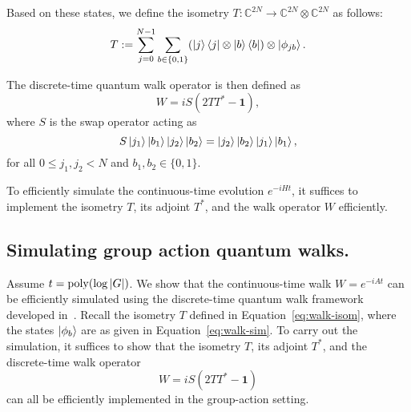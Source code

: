 \documentclass[12pt]{report}
\newcommand{\opnorm}[1]{\left\lVert #1 \right\rVert}
\begin{document}
Based on these states, we define the isometry \( T : \mathbb{C}^{2N} \to \mathbb{C}^{2N} \otimes \mathbb{C}^{2N} \) as follows:
\begin{equation}
    \label{eq:walk-isom}
    T := \sum_{j = 0}^{N - 1} \sum_{b \in \{0, 1\}} (\ket{j}\bra{j} \otimes \ket{b}\bra{b}) \otimes \ket{\phi_{jb}}.
\end{equation}

The discrete-time quantum walk operator is then defined as
\[
W = iS(2TT^* - \mathbf{1}),
\]
where \( S \) is the swap operator acting as
\[
S \ket{j_1} \ket{b_1} \ket{j_2} \ket{b_2} = \ket{j_2} \ket{b_2} \ket{j_1} \ket{b_1},
\]
for all \( 0 \le j_1, j_2 < N \) and \( b_1, b_2 \in \{0, 1\} \).

To efficiently simulate the continuous-time evolution \( e^{-iHt} \), it suffices to implement the isometry \( T \), its adjoint \( T^* \), and the walk operator \( W \) efficiently.








\subsection{Simulating group action quantum walks.}
Assume \( t = \operatorname{poly}(\log \abs{G}) \). We show that the continuous-time walk \( W = e^{-iAt} \) can be efficiently simulated using the discrete-time quantum walk framework developed in~\cite{childs2010relationship, berry2015hamiltonian}. Recall the isometry \( T \) defined in Equation~\eqref{eq:walk-isom}, where the states \( \ket{\phi_b} \) are as given in Equation~\eqref{eq:walk-sim}. To carry out the simulation, it suffices to show that the isometry \( T \), its adjoint \( T^* \), and the discrete-time walk operator
\[
W = iS(2TT^* - \mathbf{1})
\]
can all be efficiently implemented in the group-action setting.
\end{document}
